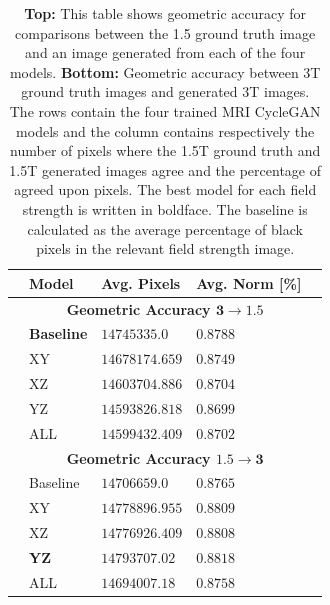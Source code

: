 \documentclass[12pt, fleqn, titlepage]{article}
\newcommand{\1}[1]{\mathds{1}\left[#1\right]}
\begin{document}
\begin{table}[H]
	\begin{center}
		\begin{tabular}{l l l l l}
			\toprule
			& \textbf{Model}   & \textbf{Avg. Pixels} & \textbf{Avg. Norm [\%]}  & \\ \midrule
			&\multicolumn{3}{c}{\textbf{Geometric Accuracy $\mathbf{3\rightarrow1.5}$}}   & \\
			&\textbf{Baseline}          & $\mathbf{14745335.0}$         & $\mathbf{0.8788}$                 & \\
			&XY                & $14678174.659$       & $0.8749$                 & \\
			&XZ                & $14603704.886$       & $0.8704$                 & \\
			&YZ                & $14593826.818$       & $0.8699$                 & \\
			&ALL               & $14599432.409$       & $0.8702$                 & \\
			&\multicolumn{3}{c}{\textbf{Geometric Accuracy $\mathbf{1.5\rightarrow3}$}}   & \\
			&Baseline          & $14706659.0$         & $0.8765$                 & \\
			&XY                & $14778896.955$	      & $0.8809$                 & \\
			&XZ                & $14776926.409$       & $0.8808$                 & \\
			&\textbf{YZ}                & $\mathbf{14793707.02}$        & $\mathbf{0.8818}$                 & \\
			&ALL               & $14694007.18$        & $0.8758$                 & \\ \bottomrule
		\end{tabular}
		\caption{\textbf{Top:} This table shows geometric accuracy for comparisons between the 1.5 ground truth image and an image generated from each of the four models. \textbf{Bottom:} Geometric accuracy between 3T ground truth images and generated 3T images. The rows contain the four trained MRI CycleGAN models and the column contains respectively the number of pixels where the 1.5T ground truth and 1.5T generated images agree and the percentage of agreed upon pixels. The best model for each field strength is written in boldface. The baseline is calculated as the average percentage of black pixels in the relevant field strength image.}
		\label{tab:metrics_geometric_accuracy}
	\end{center}
\end{table}
\end{document}
